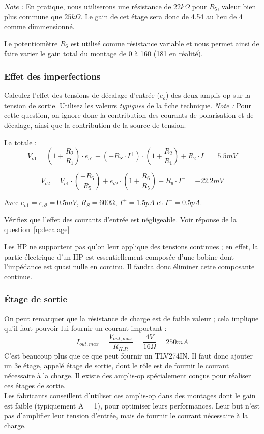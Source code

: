 \documentclass{../template/labo}
\begin{document}
\textit{Note :} En pratique, nous utiliserons une résistance de $22 k\Omega$ pour $R_5$, valeur bien plus commune que $25 k\Omega$. Le gain de cet étage sera donc de 4.54 au lieu de 4 comme dimmensionné.

Le potentiomètre $R_6$ est utilisé comme résistance variable et nous permet ainsi de faire varier le gain total du montage de 0 à 160 (181 en réalité).

\subsubsection{Effet des imperfections}

\Question
{\label{q:decalage}
Calculez l'effet des tensions de décalage d'entrée ($e_o$) des deux amplis-op sur la tension de sortie. Utilisez les valeurs \textit{typiques} de la fiche technique.
\textit{Note :} Pour cette question, on ignore donc la contribution des courants de polarisation et de décalage, ainsi que la contribution de la source de tension.
}
{La totale : $$V_{o1} = \left(1 + \frac{R_2}{R_1}\right) \cdot e_{o1} + (-R_S\cdot I^+) \cdot \left(1 + \frac{R_2}{R_1} \right) + R_2\cdot I^- = 5.5 mV$$

$$V_{o2} = V_{o1} \cdot \left( \frac{-R_6}{R_5} \right) + e_{o2} \cdot \left( 1 + \frac{R_6}{R_5} \right) + R_6 \cdot I^- = -22.2 mV$$

Avec $e_{o1} = e_{o2} = 0.5 mV$, $R_S = 600 \si{\ohm}$, $I^+ = 1.5 pA$ et $I^-= 0.5 pA$.
}

\Question
{
Vérifiez que l'effet des courants d'entrée est négligeable.
}
{Voir réponse de la question~\ref{q:decalage}}

Les HP ne supportent pas qu'on leur applique des tensions continues ; en effet, la partie électrique d'un HP est essentiellement composée d'une bobine dont l'impédance est quasi nulle en continu. Il faudra donc éliminer cette composante continue.

\subsubsection{Étage de sortie}
On peut remarquer que la résistance de charge est de faible valeur ; cela implique qu'il faut pouvoir lui fournir un courant important :
$$I_{out,max}=\frac{V_{out,max}}{R_{H.P.}}=\frac{4V}{16\Omega}=250mA$$
C'est beaucoup plus que ce que peut fournir un TLV274IN. Il faut donc ajouter un 3e étage, appelé étage de sortie, dont le rôle est de fournir le courant nécessaire à la charge. Il existe des amplis-op spécialement conçus pour réaliser ces étages de sortie.\\
Les fabricants conseillent d'utiliser ces amplis-op dans des montages dont le gain est faible (typiquement A = 1), pour optimiser leurs performances. Leur but n'est pas d'amplifier leur tension d'entrée, mais de fournir le courant
nécessaire à la charge.
\end{document}
